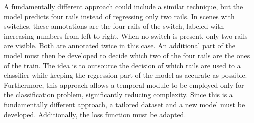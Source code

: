 A fundamentally different approach could include a similar technique, but the model predicts four rails instead of regressing only two rails.
In scenes with switches, these annotations are the four rails of the switch, labeled with increasing numbers from left to right.
When no switch is present, only two rails are visible.
Both are annotated twice in this case.
An additional part of the model must then be developed to decide which two of the four rails are the ones of the train.
The idea is to outsource the decision of which rails are used to a classifier while keeping the regression part of the model as accurate as possible.
Furthermore, this approach allows a temporal module to be employed only for the classification problem, significantly reducing complexity.
Since this is a fundamentally different approach, a tailored dataset and a new model must be developed.
Additionally, the loss function must be adapted.
